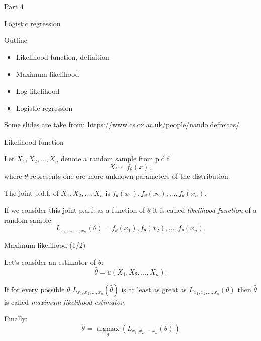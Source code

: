 \documentclass{beamer}
\DeclareMathOperator*{\argmax}{argmax}
\begin{document}
\begin{frame}
{\centerline{Part 4}}

\begin{center}
\Huge Logistic regression
\end{center}
\end{frame}


\begin{frame}
{\centerline{Outline}}
\begin{itemize}
\item Likelihood function, definition
\item Maximum likelihood
\item Log likelihood
\item Logistic regression
\end{itemize}

\vspace*{2cm}
Some slides are take from: \url{https://www.cs.ox.ac.uk/people/nando.defreitas/}
\end{frame}


\begin{frame}
{\centerline{Likelihood function }}
Let $X_1,X_2,...,X_n$ denote a random sample from p.d.f.
$$X_i \sim f_{\theta}(x),$$
where $\theta$ represents one ore more unknown parameters of the distribution.

The joint p.d.f. of $X_1, X_2, ..., X_n$ is $f_{\theta}(x_1),f_{\theta}(x_2),...,f_{\theta}(x_n)$.

If we consider this joint p.d.f. as a function of $\theta$ it is called \textit{likelihood function} of a random sample:
$$L_{x_1,x_2,...,x_n}(\theta)=f_{\theta}(x_1),f_{\theta}(x_2),...,f_{\theta}(x_n).$$
\end{frame}

\begin{frame}
{\centerline{Maximum likelihood (1/2)}}
Let's consider an estimator of $\theta$:
$$\hat{\theta} = u(X_1,X_2,...,X_n).$$

If for every possible $\theta$ $L_{x_1,x_2,...,x_n}(\hat{\theta})$ is at least as great as $L_{x_1,x_2,...,x_n}(\theta)$ then $\hat{\theta}$ is called \textit{maximum likelihood estimator}.

Finally:
$$\hat{\theta} = \argmax\limits_{\theta}(L_{x_1,x_2,...,x_n}(\theta))$$

\end{frame}
\end{document}
